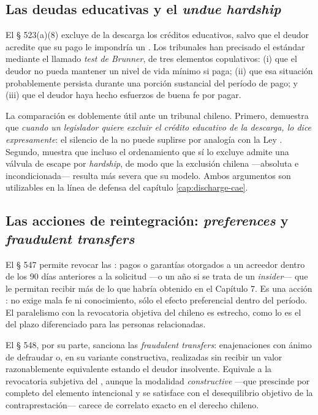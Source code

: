 \subsection{Las deudas educativas y el \emph{undue hardship}}

El § 523(a)(8) excluye de la descarga los créditos educativos, salvo que el deudor acredite que su
pago le impondría un . Los tribunales han precisado el estándar
mediante el llamado \emph{test de Brunner}, de tres elementos copulativos: (i) que el deudor no
pueda mantener un nivel de vida mínimo si paga; (ii) que esa situación probablemente persista
durante una porción sustancial del período de pago; y (iii) que el deudor haya hecho esfuerzos de
buena fe por pagar.

\begin{practica}
La comparación es doblemente útil ante un tribunal chileno. Primero, demuestra que \emph{cuando un
legislador quiere excluir el crédito educativo de la descarga, lo dice expresamente}: el silencio
de la \LIR{} no puede suplirse por analogía con la Ley . Segundo, muestra que incluso el
ordenamiento que sí lo excluye admite una válvula de escape por \emph{hardship}, de modo que la
exclusión chilena ---absoluta e incondicionada--- resulta más severa que su modelo. Ambos
argumentos son utilizables en la línea de defensa del capítulo \ref{cap:discharge-cae}.
\end{practica}

\subsection{Las acciones de reintegración: \emph{preferences} y \emph{fraudulent transfers}}

El § 547 permite revocar las : pagos o garantías otorgados
a un acreedor dentro de los 90 días anteriores a la solicitud ---o un año si se trata de un
\emph{insider}--- que le permitan recibir más de lo que habría obtenido en el Capítulo 7. Es una
acción : no exige mala fe ni conocimiento, sólo el efecto preferencial
dentro del período. El paralelismo con la revocatoria objetiva del  chileno es estrecho,
como lo es el del plazo diferenciado para las personas relacionadas.

El § 548, por su parte, sanciona las \emph{fraudulent transfers}: enajenaciones con ánimo de
defraudar o, en su variante constructiva, realizadas sin recibir un valor razonablemente
equivalente estando el deudor insolvente. Equivale a la revocatoria subjetiva del ,
aunque la modalidad \emph{constructive} ---que prescinde por completo del elemento intencional y se
satisface con el desequilibrio objetivo de la contraprestación--- carece de correlato exacto en el
derecho chileno.

